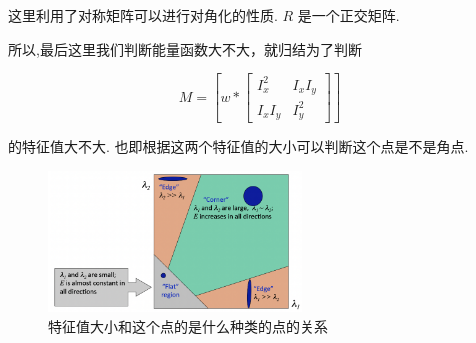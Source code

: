 这里利用了对称矩阵可以进行对角化的性质. $R$ 是一个正交矩阵.

所以,最后这里我们判断能量函数大不大，就归结为了判断 

\begin{equation}
    M = \left[
        w *
        \begin{bmatrix}
        I_x^2 & I_x I_y \\
        I_x I_y & I_y^2
        \end{bmatrix}
    \right]
\end{equation}

的特征值大不大. 也即根据这两个特征值的大小可以判断这个点是不是角点.

\begin{figure}[htbp]
    \centering
    \includegraphics[width=0.6\textwidth]{figures/corner_map.png}
    \caption{特征值大小和这个点的是什么种类的点的关系}
\end{figure}


